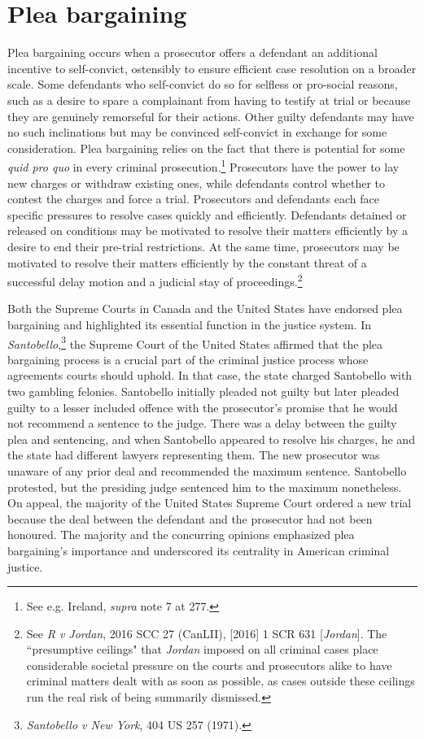 \section{Plea bargaining}

Plea bargaining occurs when a prosecutor offers a defendant an additional incentive to self-convict, ostensibly to ensure efficient case resolution on a broader scale. Some defendants who self-convict do so for selfless or pro-social reasons, such as a desire to spare a complainant from having to testify at trial or because they are genuinely remorseful for their actions. Other guilty defendants may have no such inclinations but may be convinced self-convict in exchange for some consideration. Plea bargaining relies on the fact that there is potential for some \textit{quid pro quo} in every criminal prosecution.\footnote{See e.g. Ireland, \textit{supra} note 7 at 277.} Prosecutors have the power to lay new charges or withdraw existing ones, while defendants control whether to contest the charges and force a trial. Prosecutors and defendants each face specific pressures to resolve cases quickly and efficiently. Defendants detained or released on conditions may be motivated to resolve their matters efficiently by a desire to end their pre-trial restrictions. At the same time, prosecutors may be motivated to resolve their matters efficiently by the constant threat of a successful delay motion and a judicial stay of proceedings.\footnote{See \textit{R v Jordan}, 2016 SCC 27 (CanLII), [2016] 1 SCR 631 [\textit{Jordan}]. The ``presumptive ceilings" that \textit{Jordan} imposed on all criminal cases place considerable societal pressure on the courts and prosecutors alike to have criminal matters dealt with as soon as possible, as cases outside these ceilings run the real risk of being summarily dismissed.}

Both the Supreme Courts in Canada and the United States have endorsed plea bargaining and highlighted its essential function in the justice system. In \textit{Santobello},\footnote{\textit{Santobello v New York}, 404 US 257 (1971).} the Supreme Court of the United States affirmed that the plea bargaining process is a crucial part of the criminal justice process whose agreements courts should uphold. In that case, the state charged Santobello with two gambling felonies. Santobello initially pleaded not guilty but later pleaded guilty to a lesser included offence with the prosecutor's promise that he would not recommend a sentence to the judge. There was a delay between the guilty plea and sentencing, and when Santobello appeared to resolve his charges, he and the state had different lawyers representing them. The new prosecutor was unaware of any prior deal and recommended the maximum sentence. Santobello protested, but the presiding judge sentenced him to the maximum nonetheless. On appeal, the majority of the United States Supreme Court ordered a new trial because the deal between the defendant and the prosecutor had not been honoured. The majority and the concurring opinions emphasized plea bargaining's importance and underscored its centrality in American criminal justice.


